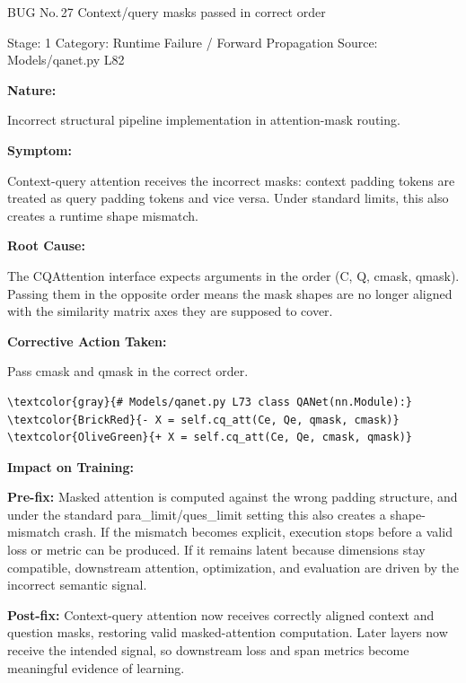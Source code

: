 \documentclass[10pt]{article}
\newcommand{\FieldLabel}[1]{%
 {\bfseries #1:}\par
}
\begin{document}
\begin{bugbox}{BUG No.\,27 \quad Context/query masks passed in correct order}
{\color{MetaGray}\small Stage: 1 \;\textbar\; Category: Runtime Failure / Forward Propagation \;\textbar\; Source: Models/qanet.py L82\par}
\vspace{0.22em}
\FieldLabel{Nature}
Incorrect structural pipeline implementation in attention-mask routing.
\par
\vspace{0.35em}
\FieldLabel{Symptom}
Context-query attention receives the incorrect masks: context padding tokens are treated as query padding tokens and vice versa. Under standard limits, this also creates a runtime shape mismatch.
\par
\vspace{0.35em}
\FieldLabel{Root Cause}
The CQAttention interface expects arguments in the order (C, Q, cmask, qmask). Passing them in the opposite order means the mask shapes are no longer aligned with the similarity matrix axes they are supposed to cover.
\par
\vspace{0.35em}
\FieldLabel{Corrective Action Taken}
Pass cmask and qmask in the correct order.
\par
\vspace{0.35em}
\begin{Verbatim}[commandchars=\\\{\},fontsize=\footnotesize,breaklines=true,breaksymbol={},frame=leftline,framerule=2pt,rulecolor=\color{gray!40},xleftmargin=6pt,formatcom=\singlespacing]
\textcolor{gray}{# Models/qanet.py L73 class QANet(nn.Module):}
\textcolor{BrickRed}{- X = self.cq_att(Ce, Qe, qmask, cmask)}
\textcolor{OliveGreen}{+ X = self.cq_att(Ce, Qe, cmask, qmask)}
\end{Verbatim}
\vspace{0.22em}
\FieldLabel{Impact on Training}
\textbf{Pre-fix:} Masked attention is computed against the wrong padding structure, and under the standard para\_limit/ques\_limit setting this also creates a shape-mismatch crash. If the mismatch becomes explicit, execution stops before a valid loss or metric can be produced. If it remains latent because dimensions stay compatible, downstream attention, optimization, and evaluation are driven by the incorrect semantic signal.\par\smallskip
\textbf{Post-fix:} Context-query attention now receives correctly aligned context and question masks, restoring valid masked-attention computation. Later layers now receive the intended signal, so downstream loss and span metrics become meaningful evidence of learning.
\par
\vspace{0.35em}
\end{bugbox}
\end{document}
